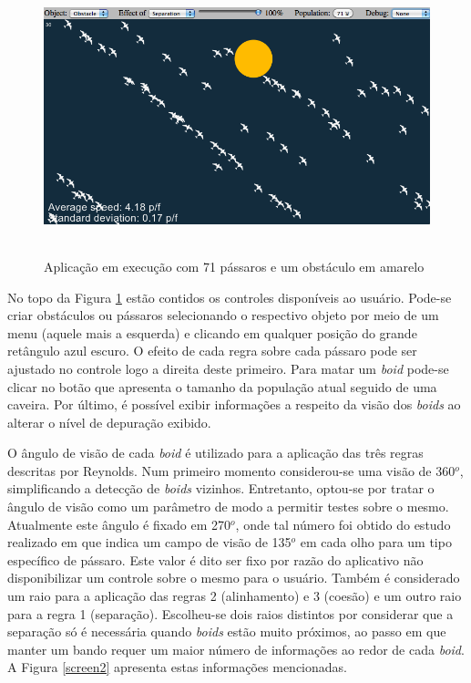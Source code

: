 \documentclass[12pt]{article}
\begin{document}
\begin{figure}[ht!]
  \centering
  \includegraphics[height=8cm]{figs/screen1.png}
  \caption{Aplicação em execução com 71 pássaros e um obstáculo em amarelo \label{screen1}}
\end{figure}

No topo da Figura \ref{screen1} estão contidos os controles
disponíveis ao usuário. Pode-se criar obstáculos ou pássaros
selecionando o respectivo objeto por meio de um menu (aquele mais a
esquerda) e clicando em qualquer posição do grande retângulo azul
escuro. O efeito de cada regra sobre cada pássaro pode ser ajustado no
controle logo a direita deste primeiro. Para matar um \textit{boid}
pode-se clicar no botão que apresenta o tamanho da população atual
seguido de uma caveira. %
Por último, é possível exibir informações
a respeito da visão dos \textit{boids} ao alterar o nível de depuração
exibido.

O ângulo de visão de cada \textit{boid} é utilizado para a aplicação
das três regras descritas por Reynolds. Num primeiro momento
considerou-se uma visão de 360$^o$, simplificando a detecção de
\textit{boids} vizinhos. Entretanto, optou-se por tratar o ângulo de
visão como um parâmetro de modo a permitir testes sobre o
mesmo. Atualmente este ângulo é fixado em 270$^o$, onde tal número foi
obtido do estudo realizado em \cite{birds} que indica um campo de
visão de 135$^o$ em cada olho para um tipo específico de
pássaro. Este valor é dito ser fixo por razão do aplicativo não
disponibilizar um controle sobre o mesmo para o usuário. %
Também é considerado
um raio para a aplicação das regras 2 (alinhamento) e 3 (coesão) e um
outro raio para a regra 1 (separação). Escolheu-se dois raios
distintos por considerar que a separação só é necessária quando
\textit{boids} estão muito próximos, ao passo em que manter um bando
requer um maior número de informações ao redor de cada
\textit{boid}. A Figura \ref{screen2} apresenta estas informações mencionadas.
\end{document}
